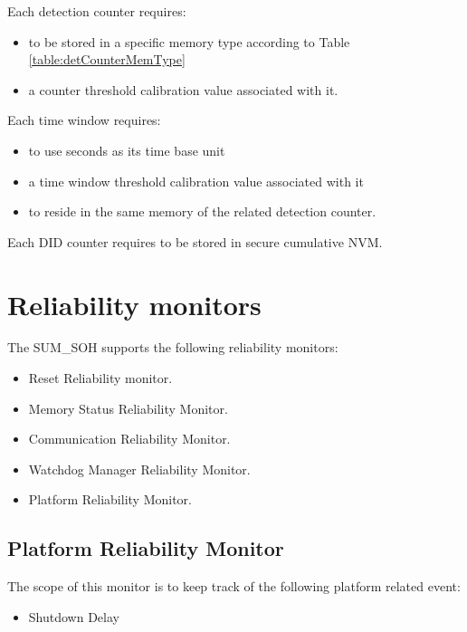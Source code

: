 {
	Each detection counter requires:
	\begin{itemize}
		\item to be stored in a specific memory type according to Table \ref{table:detCounterMemType}
		\item a counter threshold calibration value associated with it.
	\end{itemize}
}
{	 	 }

{
	Each time window requires:
	\begin{itemize}
		\item to use seconds as its time base unit
		\item a time window threshold calibration value associated with it
		\item to reside in the same memory of the related detection counter.
	\end{itemize}
}
{	 		}

{
	Each DID counter requires to be stored in secure cumulative NVM.
}
{		}

{
		
}
{		}


\section{Reliability monitors}
The SUM\_SOH supports the following reliability monitors:
\begin{itemize}
	\item Reset Reliability monitor.
	\item Memory Status Reliability Monitor.
	\item Communication Reliability Monitor.
	\item Watchdog Manager Reliability Monitor.
	\item Platform Reliability Monitor.
\end{itemize}

\subsection{Platform Reliability Monitor}
{
    The scope of this monitor is to keep track of the following platform related event:
    \begin{itemize}
		\item Shutdown Delay
    \end{itemize}
}
{
}

